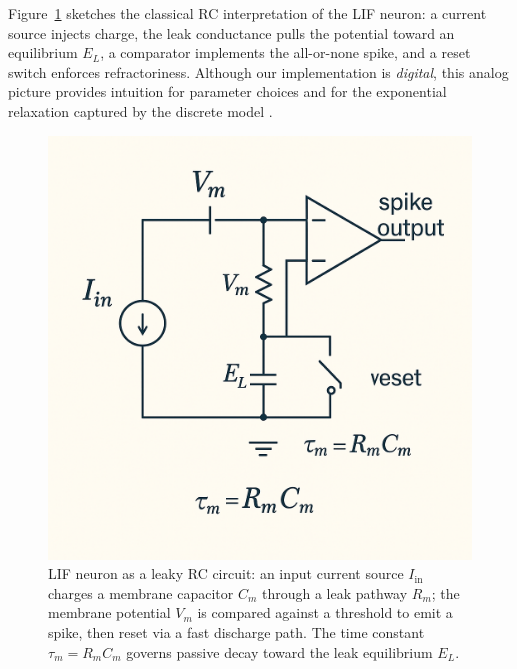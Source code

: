 \documentclass[10pt,onecolumn]{IEEEtran}
\begin{document}
Figure~\ref{fig:lif_rc} sketches the classical RC interpretation of the LIF neuron: a current source injects charge, the leak conductance pulls the potential toward an equilibrium \(E_L\), a comparator implements the all-or-none spike, and a reset switch enforces refractoriness. Although our implementation is \emph{digital}, this analog picture provides intuition for parameter choices and for the exponential relaxation captured by the discrete model \cite{GerstnerKistler2002,Mead1990}.

\begin{figure}[t]
  \centering
  \includegraphics[width=0.585\linewidth]{lif_rc_circuit.png}
  \caption{LIF neuron as a leaky RC circuit: an input current source \(I_{\mathrm{in}}\) charges a membrane capacitor \(C_m\) through a leak pathway \(R_m\); the membrane potential \(V_m\) is compared against a threshold to emit a spike, then reset via a fast discharge path. The time constant \(\tau_m=R_mC_m\) governs passive decay toward the leak equilibrium \(E_L\).}
  \label{fig:lif_rc}
\end{figure}
\end{document}
